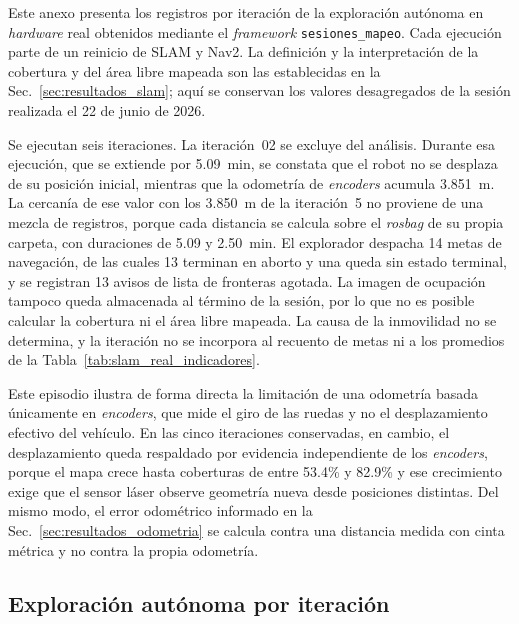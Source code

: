 \begin{appendices}
Este anexo presenta los registros por iteración de la exploración autónoma en \textit{hardware} real obtenidos mediante el \textit{framework} \texttt{sesiones\_mapeo}. Cada ejecución parte de un reinicio de SLAM y Nav2. La definición y la interpretación de la cobertura y del área libre mapeada son las establecidas en la Sec.~\ref{sec:resultados_slam}; aquí se conservan los valores desagregados de la sesión realizada el 22 de junio de 2026.

Se ejecutan seis iteraciones. La iteración~02 se excluye del análisis.
Durante esa ejecución, que se extiende por 5.09~min, se constata que
el robot no se desplaza de su posición inicial, mientras que la odometría de
\textit{encoders} acumula 3.851~m. La cercanía de ese valor con los 3.850~m de la iteración~5 no proviene de una
mezcla de registros, porque cada distancia se calcula sobre el \textit{rosbag} de su
propia carpeta, con duraciones de 5.09 y 2.50~min. El explorador despacha 14 metas de navegación, de
las cuales 13 terminan en aborto y una queda sin estado terminal, y se
registran 13 avisos de lista de fronteras agotada. La imagen de ocupación
tampoco queda almacenada al término de la sesión, por lo que no es posible
calcular la cobertura ni el área libre mapeada. La causa de la inmovilidad no
se determina, y la iteración no se incorpora al recuento de metas ni a los
promedios de la Tabla~\ref{tab:slam_real_indicadores}.

Este episodio ilustra de forma directa la limitación de una odometría basada
únicamente en \textit{encoders}, que mide el giro de las ruedas y no el desplazamiento
efectivo del vehículo. En las cinco iteraciones conservadas, en cambio, el
desplazamiento queda respaldado por evidencia independiente de los \textit{encoders},
porque el mapa crece hasta coberturas de entre 53.4\% y 82.9\% y ese
crecimiento exige que el sensor láser observe geometría nueva desde posiciones
distintas. Del mismo modo, el error odométrico informado en la
Sec.~\ref{sec:resultados_odometria} se calcula contra una distancia medida con
cinta métrica y no contra la propia odometría.

\subsection{Exploración autónoma por iteración}


\end{appendices}
